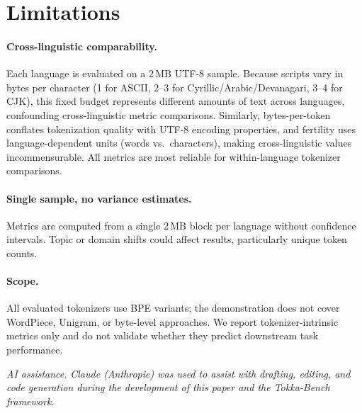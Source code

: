 \documentclass[11pt]{article}
\begin{document}
\section{Limitations}
\label{sec:limitations}

\paragraph{Cross-linguistic comparability.}
Each language is evaluated on a 2\,MB UTF-8 sample.
Because scripts vary in bytes per character (1 for ASCII, 2--3 for Cyrillic/Arabic/Devanagari, 3--4 for CJK), this fixed budget represents different amounts of text across languages, confounding cross-linguistic metric comparisons.
Similarly, bytes-per-token conflates tokenization quality with UTF-8 encoding properties, and fertility uses language-dependent units (words vs.\ characters), making cross-linguistic values incommensurable.
All metrics are most reliable for within-language tokenizer comparisons.

\paragraph{Single sample, no variance estimates.}
Metrics are computed from a single 2\,MB block per language without confidence intervals.
Topic or domain shifts could affect results, particularly unique token counts.

\paragraph{Scope.}
All evaluated tokenizers use BPE variants; the demonstration does not cover WordPiece, Unigram, or byte-level approaches.
We report tokenizer-intrinsic metrics only and do not validate whether they predict downstream task performance.

\bigskip
\noindent\textit{AI assistance.}
\textit{Claude (Anthropic) was used to assist with drafting, editing, and code generation during the development of this paper and the Tokka-Bench framework.}

\vfill\columnbreak

\end{document}
